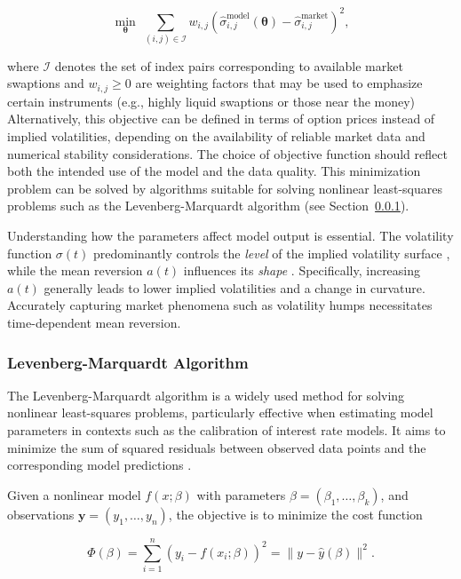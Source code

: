 \begin{equation}
\min_{\boldsymbol{\theta}} \; \sum_{(i,j) \in \mathcal{I}} w_{i,j} \left( \hat{\sigma}^{\text{model}}_{i,j}(\boldsymbol{\theta}) - \hat{\sigma}^{\text{market}}_{i,j} \right)^2,
\end{equation}

where $\mathcal{I}$ denotes the set of index pairs corresponding to available market swaptions and $w_{i,j} \geq 0$ are weighting factors that may be used to emphasize certain instruments (e.g., highly liquid swaptions or those near the money)  Alternatively, this objective can be defined in terms of option prices instead of implied volatilities, depending on the availability of reliable market data and numerical stability considerations. The choice of objective function should reflect both the intended use of the model and the data quality. This minimization problem can be solved by algorithms suitable for solving nonlinear least-squares problems such as the Levenberg-Marquardt algorithm (see Section~\ref{lm_algorithm}).

Understanding how the parameters affect model output is essential. The volatility function $\sigma(t)$ predominantly controls the \emph{level} of the implied volatility surface \parencite[p.~9]{gurrieri2009calibration}, while the mean reversion $a(t)$ influences its \emph{shape} \parencite[p.~9]{gurrieri2009calibration}. Specifically, increasing $a(t)$ generally leads to lower implied volatilities and a change in curvature. Accurately capturing market phenomena such as volatility humps necessitates time-dependent mean reversion.

\subsubsection{Levenberg-Marquardt Algorithm} \label{lm_algorithm}
The Levenberg-Marquardt algorithm is a widely used method for solving nonlinear least-squares problems, particularly effective when estimating model parameters in contexts such as the calibration of interest rate models. It aims to minimize the sum of squared residuals between observed data points and the corresponding model predictions \parencite{marquardt1963}.

Given a nonlinear model $f(x; \beta)$ with parameters $\beta = (\beta_1, \dots, \beta_k)$, and observations $\mathbf{y} = (y_1, \dots, y_n)$, the objective is to minimize the cost function

\begin{equation}
\Phi(\beta) = \sum_{i=1}^{n} \left( y_i - f(x_i; \beta) \right)^2 = \| y - \hat{y}(\beta) \|^2.
\end{equation}

